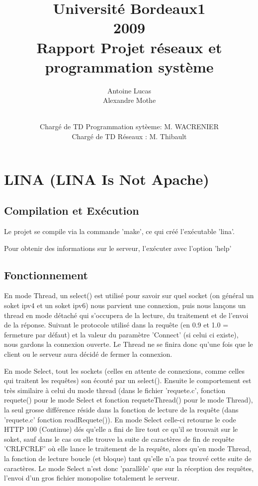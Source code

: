 \documentclass[12pt,a4paper,utf8x]{report}
\title
{
	\normalsize{Université Bordeaux1\\
	  2009}\\
	\vspace{15mm}
	\Huge{Rapport Projet réseaux et programmation système}
}
\author{Antoine Lucas\\ Alexandre Mothe\\
\\
	\vspace{45mm}
}
\date{	
	\normalsize{
	\vspace{5mm}	
	Chargé de TD Programmation sytèeme: M. WACRENIER \\
        Chargé de TD Réseaux : M. Thibault \\
	}
}
\begin{document}
\maketitle

%

\tableofcontents
\clearpage

\chapter{LINA (LINA Is Not Apache)}
\section{Compilation et Exécution}

Le projet se compile via la commande 'make', ce qui créé l'exécutable
'lina'.

Pour obtenir des informations sur le serveur, l'exécuter avec
l'option '\-\-help'

\section{Fonctionnement}

En mode Thread, un select() est utilisé pour savoir sur quel socket (on général un soket ipv4 et un soket ipv6) nous parvient une connexion, puis nous lançons un thread en mode détaché qui s'occupera de la lecture, du traitement et de l'envoi de la réponse. Suivant le protocole utilisé dans la requête (en 0.9 et 1.0 = fermeture par défaut) et la valeur du paramètre 'Connect' (si celui ci existe), nous gardons la connexion ouverte. Le Thread ne se finira donc qu'une fois que le client ou le serveur aura décidé de fermer la connexion.

En mode Select, tout les sockets (celles en attente de connexions, comme celles qui traitent les requêtes) son écouté par un select(). Ensuite le comportement est très similaire à celui du mode thread (dans le fichier 'requete.c', fonction requete() pour le mode Select et fonction requeteThread() pour le mode Thread), la seul grosse différence réside dans la fonction de lecture de la requête (dans 'requete.c' fonction readRequete()). En mode Select celle-ci retourne le code HTTP 100 (Continue) dés qu'elle a fini de lire tout ce qu'il se trouvait sur le soket, sauf dans le cas ou elle trouve la suite de caractères de fin de requête 'CRLFCRLF' où elle lance le traitement de la requête, alors qu'en mode Thread, la fonction de lecture boucle (et bloque) tant qu'elle n'a pas trouvé cette suite de caractères. Le mode Select n'est donc 'parallèle' que sur la réception des requêtes, l'envoi d'un gros fichier monopolise totalement le serveur.
\end{document}

